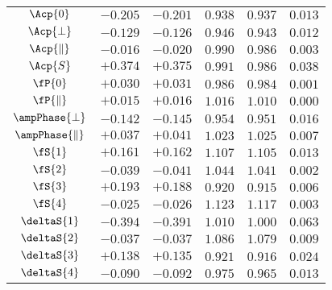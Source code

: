 \begin{table}
\begin{tabular}{c c c c c | c}
$                  \Acp{0}$ & $-0.205$ & $-0.201$ & $0.938$ & $0.937$  & $0.013$ \\
$              \Acp{\perp}$ & $-0.129$ & $-0.126$ & $0.946$ & $0.943$  & $0.012$ \\
$          \Acp{\parallel}$ & $-0.016$ & $-0.020$ & $0.990$ & $0.986$  & $0.003$ \\
$                  \Acp{S}$ & $+0.374$ & $+0.375$ & $0.991$ & $0.986$  & $0.038$ \\
\hline
$                   \fP{0}$ & $+0.030$ & $+0.031$ & $0.986$ & $0.984$  & $0.001$ \\
$           \fP{\parallel}$ & $+0.015$ & $+0.016$ & $1.016$ & $1.010$  & $0.000$ \\
$         \ampPhase{\perp}$ & $-0.142$ & $-0.145$ & $0.954$ & $0.951$  & $0.016$ \\
$     \ampPhase{\parallel}$ & $+0.037$ & $+0.041$ & $1.023$ & $1.025$  & $0.007$ \\
\hline
$                   \fS{1}$ & $+0.161$ & $+0.162$ & $1.107$ & $1.105$  & $0.013$ \\
$                   \fS{2}$ & $-0.039$ & $-0.041$ & $1.044$ & $1.041$  & $0.002$ \\
$                   \fS{3}$ & $+0.193$ & $+0.188$ & $0.920$ & $0.915$  & $0.006$ \\
$                   \fS{4}$ & $-0.025$ & $-0.026$ & $1.123$ & $1.117$  & $0.003$ \\
$               \deltaS{1}$ & $-0.394$ & $-0.391$ & $1.010$ & $1.000$  & $0.063$ \\
$               \deltaS{2}$ & $-0.037$ & $-0.037$ & $1.086$ & $1.079$  & $0.009$ \\
$               \deltaS{3}$ & $+0.138$ & $+0.135$ & $0.921$ & $0.916$  & $0.024$ \\
$               \deltaS{4}$ & $-0.090$ & $-0.092$ & $0.975$ & $0.965$  & $0.013$ \\

\end{tabular}
\end{table}
